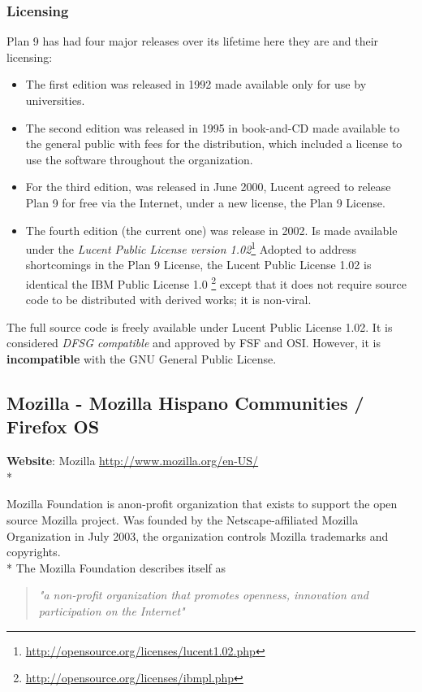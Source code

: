 \documentclass[11pt]{article} %
\begin{document}
\subsubsection{Licensing}
Plan 9 has had four major releases over its lifetime here they are and their licensing:
\begin{itemize}
\item The first edition was released in 1992 made available only for use by universities.
\item The second edition was released in 1995 in book-and-CD made available to the general public with fees for the distribution, which included a license to use the software throughout the organization.
\item For the third edition, was released in June 2000, Lucent agreed to release Plan 9 for free via the Internet, under a new license, the Plan 9 License.
\item The fourth edition (the current one) was release in 2002. Is made available under the \emph{Lucent Public License version 1.02}\footnote {\url{http://opensource.org/licenses/lucent1.02.php}} Adopted to address shortcomings in the Plan 9 License, the Lucent Public License 1.02 is identical the IBM Public License 1.0 \footnote {\url{http://opensource.org/licenses/ibmpl.php}} except that it does not require source code to be distributed with derived works; it is non-viral.
\end{itemize}
The full source code is freely available under Lucent Public License 1.02. It is considered \emph{DFSG compatible} and approved by FSF and OSI. However, it is \textbf{incompatible} with the GNU General Public License.
\subsection{Mozilla - Mozilla Hispano Communities / Firefox OS} %

\textbf{Website}: Mozilla \url {http://www.mozilla.org/en-US/} \\*

Mozilla Foundation is anon-profit organization that exists to support the open source Mozilla project. Was founded by the Netscape-affiliated Mozilla Organization in July 2003, the organization controls Mozilla trademarks and copyrights. \\*
The Mozilla Foundation describes itself as

\begin{quote}
    \emph{"a non-profit organization that promotes openness, innovation and participation on the Internet"}
\end{quote}
\end{document}
